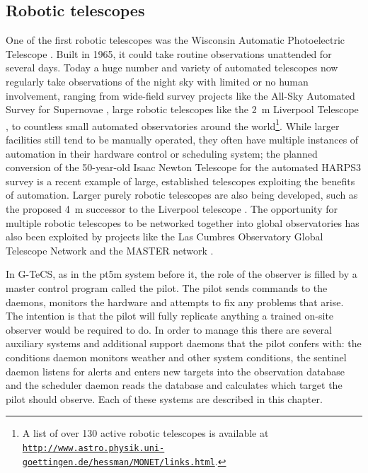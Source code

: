 \subsection{Robotic telescopes}
\label{sec:robotic_telescopes}
\begin{colsection}

One of the first robotic telescopes was the Wisconsin Automatic Photoelectric Telescope \citep{Wisconsin_APT}. Built in 1965, it could take routine observations unattended for several days. Today a huge number and variety of automated telescopes now regularly take observations of the night sky with limited or no human involvement, ranging from wide-field survey projects like the All-Sky Automated Survey for Supernovae  \citep[ASAS-SN,][]{ASAS-SN}, large robotic telescopes like the \SI{2}{\metre} Liverpool Telescope \citep{Liverpool}, to countless small automated observatories around the world\footnote{A list of over 130 active robotic telescopes is available at \href{http://www.astro.physik.uni-goettingen.de/~hessman/MONET/links.html}{\texttt{http://www.astro.physik.uni-}} \\ \href{http://www.astro.physik.uni-goettingen.de/~hessman/MONET/links.html}{\texttt{goettingen.de/\raisebox{0.5ex}{\texttildelow}hessman/MONET/links.html}}.}. While larger facilities still tend to be manually operated, they often have multiple instances of automation in their hardware control or scheduling system; the planned conversion of the 50-year-old Isaac Newton Telescope for the automated HARPS3 survey \citep{INT_robotic} is a recent example of large, established telescopes exploiting the benefits of automation. Larger purely robotic telescopes are also being developed, such as the proposed \SI{4}{\metre} successor to the Liverpool telescope \citep{Liverpool2}. The opportunity for multiple robotic telescopes to be networked together into global observatories has also been exploited by projects like the Las Cumbres Observatory Global Telescope Network \citep{LCO} and the MASTER network \citep{MASTER}.

In G-TeCS, as in the pt5m system before it, the role of the observer is filled by a master control program called the pilot. The pilot sends commands to the daemons, monitors the hardware and attempts to fix any problems that arise. The intention is that the pilot will fully replicate anything a trained on-site observer would be required to do. In order to manage this there are several auxiliary systems and additional support daemons that the pilot confers with: the conditions daemon monitors weather and other system conditions, the sentinel daemon listens for alerts and enters new targets into the observation database and the scheduler daemon reads the database and calculates which target the pilot should observe. Each of these systems are described in this chapter.

\end{colsection}


